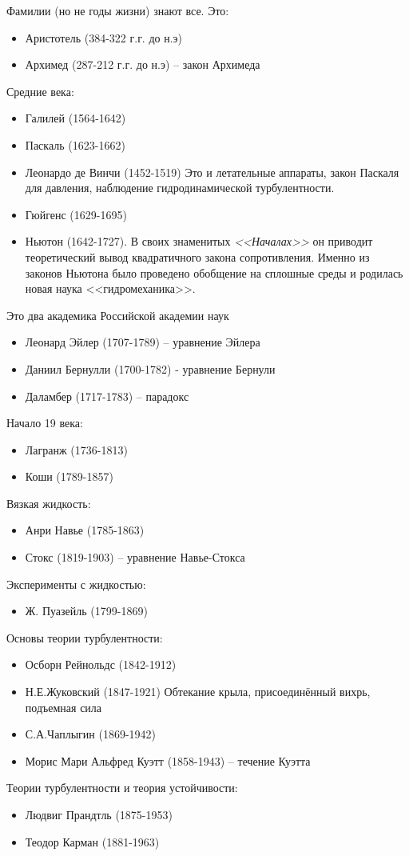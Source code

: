 Фамилии (но не годы жизни) знают все. Это:
\begin{itemize}
	\setlength\itemsep{-0.4em}
	\item Аристотель (384-322 г.г. до н.э)
	\item Архимед (287-212 г.г. до н.э) -- закон Архимеда
\end{itemize}
	Средние века:
\begin{itemize}
	\setlength\itemsep{-0.4em}
	\item Галилей (1564-1642)
	\item Паскаль (1623-1662) 
	\item Леонардо де Винчи (1452-1519)
	Это и летательные аппараты, закон Паскаля для давления, наблюдение гидродинамической турбулентности.
	\item Гюйгенс (1629-1695)
	\item Ньютон (1642-1727). В своих знаменитых \emph{<<Началах>>} он приводит теоретический вывод квадратичного закона сопротивления. Именно из законов Ньютона было проведено обобщение на сплошные среды и родилась новая наука <<гидромеханика>>.
\end{itemize}
Это два академика Российской академии наук
\begin{itemize}
	\setlength\itemsep{-0.4em}
	\item Леонард Эйлер (1707-1789) -- уравнение Эйлера
	\item Даниил Бернулли (1700-1782) -  уравнение Бернули
	\item Даламбер (1717-1783) -- парадокс
\end{itemize}
Начало 19 века:
\begin{itemize}
	\setlength\itemsep{-0.4em}
	\item Лагранж (1736-1813)
	\item Коши (1789-1857)
\end{itemize}
Вязкая жидкость:
\begin{itemize}
	\setlength\itemsep{-0.4em}
	\item Анри Навье  (1785-1863)
	\item Стокс (1819-1903) -- уравнение Навье-Стокса
\end{itemize}
Эксперименты с жидкостью:
\begin{itemize}
	\setlength\itemsep{-0.4em}
	\item Ж. Пуазейль (1799-1869)
\end{itemize}
Основы теории турбулентности:
\begin{itemize}
	\setlength\itemsep{-0.4em}
	\item Осборн Рейнольдс (1842-1912)
	\item Н.Е.Жуковский (1847-1921) Обтекание крыла, присоединённый вихрь, подъемная сила
	\item С.А.Чаплыгин (1869-1942)
	\item Морис Мари Альфред Куэтт  (1858-1943) -- течение Куэтта
\end{itemize}
Теории турбулентности и теория устойчивости:
\begin{itemize}
	\setlength\itemsep{-0.4em}
	\item Людвиг Прандтль  (1875-1953)
	\item Теодор Карман (1881-1963)
\end{itemize}

